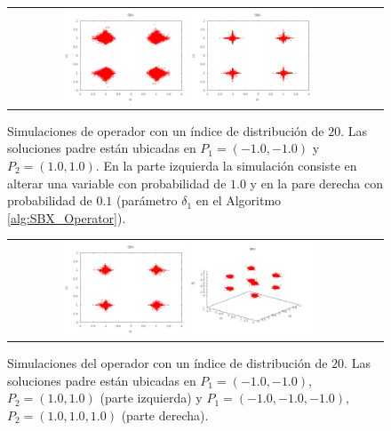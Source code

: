 \begin{figure}[!t]
\centering
\begin{tabular}{cc}
   \includegraphics[width=0.35\textwidth]{img/Operadores/SBX_eta_20_2D_pv_1.png} 
   \includegraphics[width=0.35\textwidth]{img/Operadores/SBX_eta_20_2D_pv_01.png} 
\end{tabular}
\caption{Simulaciones de operador \SBX{} con un índice de distribución de $20$. Las soluciones padre están ubicadas en $P_1=(-1.0, -1.0)$ y $P_2=(1.0, 1.0)$. En la parte izquierda la simulación consiste en alterar una variable con probabilidad de $1.0$ y en la pare derecha con probabilidad de $0.1$ (parámetro $\delta_1$ en el Algoritmo \ref{alg:SBX_Operator}).}
\label{fig:Simulation_pv}
\end{figure}



%
\begin{figure}[!t]
\centering
\begin{tabular}{cc}
   \includegraphics[width=0.35\textwidth]{img/Operadores/SBX_eta_20_2D.png} 
   \includegraphics[width=0.35\textwidth]{img/Operadores/SBX_eta_20_3D.png} 
\end{tabular}
\caption{Simulaciones del operador \SBX{} con un índice de distribución de $20$. Las soluciones padre están ubicadas en $P_1=(-1.0, -1.0)$, $P_2=(1.0, 1.0)$ (parte izquierda) y $P_1=(-1.0, -1.0, -1.0)$, $P_2=(1.0, 1.0, 1.0)$ (parte derecha).}
\label{fig:Simulations_Index_20}
\end{figure}


